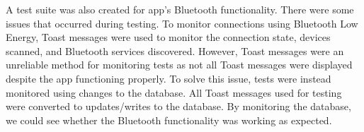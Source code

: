 \documentclass[../report.tex]{subfiles}
\begin{document}
A test suite was also created for app’s Bluetooth functionality. There were some issues that occurred during testing. To monitor connections using Bluetooth Low Energy, Toast messages were used to monitor the connection state, devices scanned, and Bluetooth services discovered. However, Toast messages were an unreliable method for monitoring tests as not all Toast messages were displayed despite the app functioning properly. To solve this issue, tests were instead monitored using changes to the database. All Toast messages used for testing were converted to updates/writes to the database. By monitoring the database, we could see whether the Bluetooth functionality was working as expected. 
\end{document}
